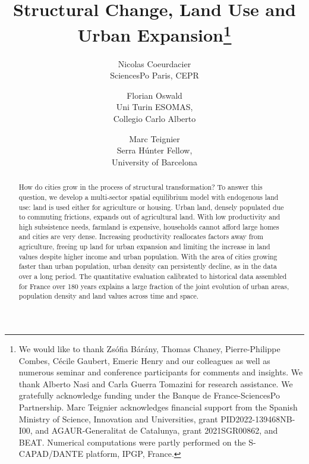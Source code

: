 \documentclass[11pt]{article}
\begin{document}
	
	
\title{Structural Change, Land Use and Urban Expansion\thanks{We would like to thank Zs\'ofia B\'ar\'any, Thomas Chaney, Pierre-Philippe Combes, C\'ecile Gaubert, Emeric Henry and our colleagues as well as numerous seminar and conference participants for comments and insights. We thank Alberto Nasi and Carla Guerra Tomazini for research assistance. We gratefully acknowledge funding under the Banque de France-SciencesPo Partnership. Marc Teignier acknowledges financial support from the Spanish Ministry of Science, Innovation and Universities, grant PID2022-139468NB-I00, and AGAUR-Generalitat de Catalunya, grant 2021SGR00862, and BEAT. Numerical computations were partly performed on the S-CAPAD/DANTE platform, IPGP, France.}}
\author{%
	Nicolas Coeurdacier\\ \small SciencesPo Paris, CEPR
	\and Florian Oswald\\ \small Uni Turin ESOMAS,\\\small Collegio Carlo Alberto
	\and Marc Teignier\\ \small Serra Húnter Fellow, \\\small University of Barcelona
}

\maketitle

\begin{abstract}
	\noindent 
	 How do cities grow in the process of structural transformation? To answer this question, we develop a multi-sector spatial equilibrium model with endogenous land use: land is used either for agriculture or housing. Urban land, densely populated due to commuting frictions, expands out of agricultural land. With low productivity and high subsistence needs, farmland is expensive, households cannot afford large homes and cities are very dense. Increasing productivity reallocates factors away from agriculture, freeing up land for urban expansion and limiting the increase in land values despite higher income and urban population. With the area of cities growing faster than urban population, urban density can persistently decline, as in the data over a long period. The quantitative evaluation calibrated to historical data assembled for France over 180 years explains a large fraction of the joint evolution of urban areas, population density and land values across time and space. 
\end{abstract}
\end{document}
